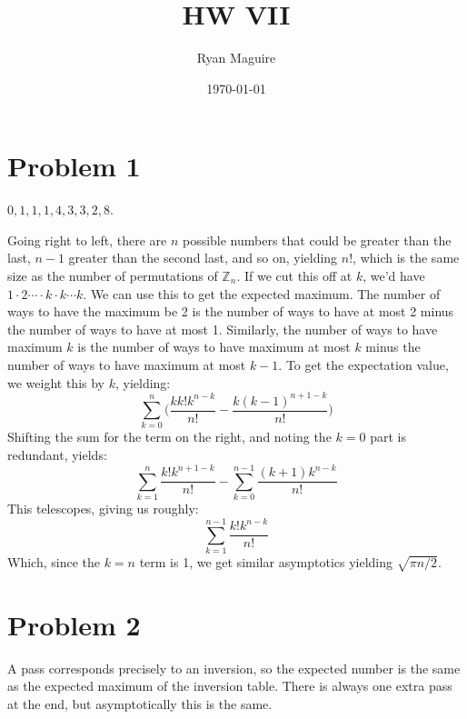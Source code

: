\documentclass{article}
\title{HW VII}
\author{Ryan Maguire}
\date{\today}
\begin{document}
    \maketitle
    \section*{Problem 1}
        $0,1,1,1,4,3,3,2,8$.
        \par\hfill\par\noindent
        Going right to left, there are $n$ possible numbers that could
        be greater than the last, $n-1$ greater than the second last,
        and so on, yielding $n!$, which is the same size as the number of
        permutations of $\mathbb{Z}_{n}$. If we cut this off at $k$, we'd have
        $1\cdot{2}\cdots\cdot{k}\cdot{k}\cdots{k}$. We can use this to get the
        expected maximum. The number of ways to have the maximum be 2 is the
        number of ways to have at most 2 minus the number of ways to have at
        most 1. Similarly, the number of ways to have maximum $k$ is the number
        of ways to have maximum at most $k$ minus the number of ways to have
        maximum at most $k-1$. To get the expectation  value, we weight this
        by $k$, yielding:
        \begin{equation}
            \sum_{k=0}^{n}\Big(\frac{kk!k^{n-k}}{n!}-
                \frac{k(k-1)^{n+1-k}}{n!}\Big)
        \end{equation}
        Shifting the sum for the term on the right, and noting the $k=0$ part
        is redundant, yields:
        \begin{equation}
            \sum_{k=1}^{n}\frac{k!k^{n+1-k}}{n!}
            -\sum_{k=0}^{n-1}\frac{(k+1)k^{n-k}}{n!}
        \end{equation}
        This telescopes, giving us roughly:
        \begin{equation}
            \sum_{k=1}^{n-1}\frac{k!k^{n-k}}{n!}
        \end{equation}
        Which, since the $k=n$ term is 1, we get similar asymptotics yielding
        $\sqrt{\pi{n}/2}$.
    \section*{Problem 2}
        A pass corresponds precisely to an inversion, so the expected number is
        the same as the expected maximum of the inversion table. There is
        always one extra pass at the end, but asymptotically this is the same.
\end{document}
